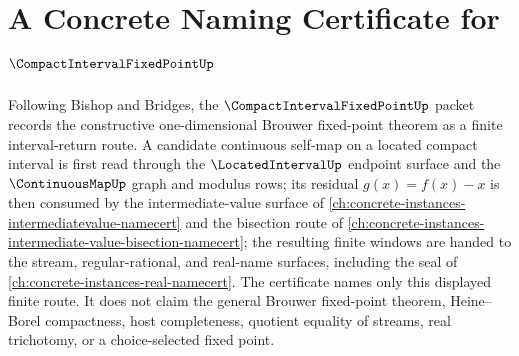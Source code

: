 \chapter{A Concrete Naming Certificate for $\CompactIntervalFixedPointUp$}
\label{ch:concrete-instances-compactintervalfixedpoint-namecert}

Following Bishop and Bridges, the $\CompactIntervalFixedPointUp$ packet records the constructive one-dimensional Brouwer fixed-point theorem as a finite interval-return route. A candidate continuous self-map on a located compact interval is first read through the $\LocatedIntervalUp$ endpoint surface and the $\ContinuousMapUp$ graph and modulus rows; its residual $g(x)=f(x)-x$ is then consumed by the intermediate-value surface of \autoref{ch:concrete-instances-intermediatevalue-namecert} and the bisection route of \autoref{ch:concrete-instances-intermediate-value-bisection-namecert}; the resulting finite windows are handed to the stream, regular-rational, and real-name surfaces, including the seal of \autoref{ch:concrete-instances-real-namecert}. The certificate names only this displayed finite route. It does not claim the general Brouwer fixed-point theorem, Heine--Borel compactness, host completeness, quotient equality of streams, real trichotomy, or a choice-selected fixed point.

